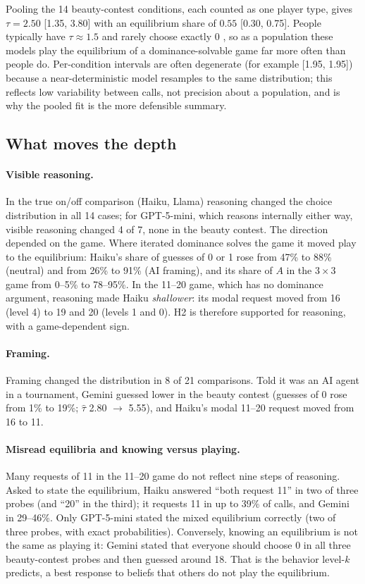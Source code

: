 \documentclass[11pt]{article}
\begin{document}
Pooling the 14 beauty-contest conditions, each counted as one player type, gives $\tau=2.50$ [1.35, 3.80] with an equilibrium share of $0.55$ [0.30, 0.75]. People typically have $\tau\approx1.5$ and rarely choose exactly 0 \citep{camerer2004,nagel1995}, so as a population these models play the equilibrium of a dominance-solvable game far more often than people do. Per-condition intervals are often degenerate (for example [1.95, 1.95]) because a near-deterministic model resamples to the same distribution; this reflects low variability between calls, not precision about a population, and is why the pooled fit is the more defensible summary.

\subsection{What moves the depth}
\paragraph{Visible reasoning.} In the true on/off comparison (Haiku, Llama) reasoning changed the choice distribution in all 14 cases; for GPT-5-mini, which reasons internally either way, visible reasoning changed 4 of 7, none in the beauty contest. The direction depended on the game. Where iterated dominance solves the game it moved play to the equilibrium: Haiku's share of guesses of 0 or 1 rose from 47\% to 88\% (neutral) and from 26\% to 91\% (AI framing), and its share of $A$ in the $3{\times}3$ game from 0--5\% to 78--95\%. In the 11--20 game, which has no dominance argument, reasoning made Haiku \emph{shallower}: its modal request moved from 16 (level 4) to 19 and 20 (levels 1 and 0). H2 is therefore supported for reasoning, with a game-dependent sign.

\paragraph{Framing.} Framing changed the distribution in 8 of 21 comparisons. Told it was an AI agent in a tournament, Gemini guessed lower in the beauty contest (guesses of 0 rose from 1\% to 19\%; $\hat\tau$ 2.80 $\to$ 5.55), and Haiku's modal 11--20 request moved from 16 to 11.

\paragraph{Misread equilibria and knowing versus playing.} Many requests of 11 in the 11--20 game do not reflect nine steps of reasoning. Asked to state the equilibrium, Haiku answered ``both request 11'' in two of three probes (and ``20'' in the third); it requests 11 in up to 39\% of calls, and Gemini in 29--46\%. Only GPT-5-mini stated the mixed equilibrium correctly (two of three probes, with exact probabilities). Conversely, knowing an equilibrium is not the same as playing it: Gemini stated that everyone should choose 0 in all three beauty-contest probes and then guessed around 18. That is the behavior level-$k$ predicts, a best response to beliefs that others do not play the equilibrium.
\end{document}
